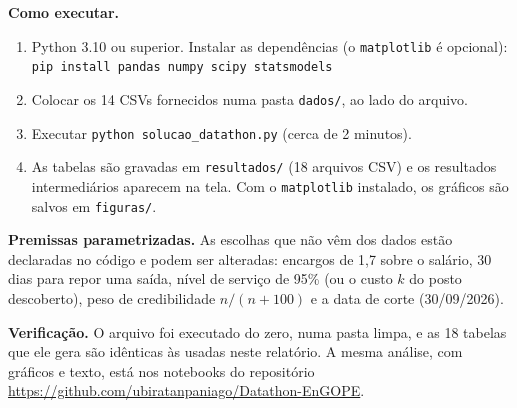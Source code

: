 \documentclass[11pt,a4paper]{article}
\begin{document}
\textbf{Como executar.}
\begin{enumerate}
\item Python 3.10 ou superior. Instalar as dependências (o \texttt{matplotlib} é opcional):\\ \texttt{pip install pandas numpy scipy statsmodels}
\item Colocar os 14 CSVs fornecidos numa pasta \texttt{dados/}, ao lado do arquivo.
\item Executar \texttt{python solucao\_datathon.py} (cerca de 2 minutos).
\item As tabelas são gravadas em \texttt{resultados/} (18 arquivos CSV) e os resultados intermediários aparecem na tela. Com o \texttt{matplotlib} instalado, os gráficos são salvos em \texttt{figuras/}.
\end{enumerate}

\textbf{Premissas parametrizadas.} As escolhas que não vêm dos dados estão declaradas no código e podem ser alteradas: encargos de 1,7 sobre o salário, 30 dias para repor uma saída, nível de serviço de 95\% (ou o custo $k$ do posto descoberto), peso de credibilidade $n/(n+100)$ e a data de corte (30/09/2026).

\textbf{Verificação.} O arquivo foi executado do zero, numa pasta limpa, e as 18 tabelas que ele gera são idênticas às usadas neste relatório. A mesma análise, com gráficos e texto, está nos notebooks do repositório \url{https://github.com/ubiratanpaniago/Datathon-EnGOPE}.
\end{document}
